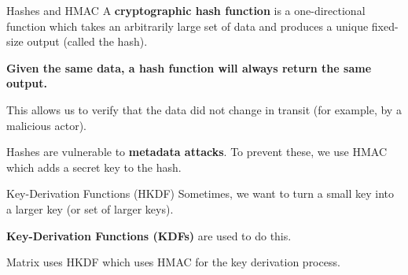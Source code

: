 \documentclass{beeper}
\begin{document}
\begin{frame}{Hashes and HMAC}
    A \textbf{cryptographic hash function} is a one-directional function which
    takes an arbitrarily large set of data and produces a unique fixed-size
    output (called the hash).
    \pause

    \textbf{Given the same data, a hash function will always return the same
    output.}
    \pause

    This allows us to verify that the data did not change in transit (for
    example, by a malicious actor).
    \pause

    Hashes are vulnerable to \textbf{metadata attacks}. To prevent these, we use
    HMAC which adds a secret key to the hash.

\end{frame}

\begin{frame}{Key-Derivation Functions (HKDF)}
    Sometimes, we want to turn a small key into a larger key (or set of larger
    keys).


    \textbf{Key-Derivation Functions (KDFs)} are used to do this.
    \pause

    Matrix uses HKDF which uses HMAC for the key derivation process.
\end{frame}
\end{document}
